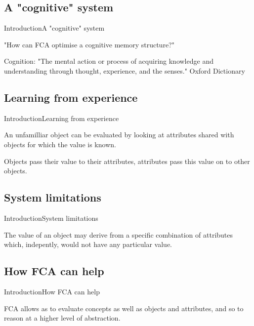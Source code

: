 \subsection{A "cognitive" system}
\begin{frame}{Introduction}{A "cognitive" system}

"How can FCA  optimise a cognitive memory  structure?"

Cognition:
"The mental action or process of acquiring knowledge and understanding through 
thought, experience, and the senses."
Oxford Dictionary

\end{frame}

\subsection{Learning from experience}
\begin{frame}{Introduction}{Learning from experience}

An unfamilliar object can be evaluated by looking at attributes shared with 
objects for which the value is known.

Objects pass their value to their attributes, attributes pass this value on to 
other objects.

\end{frame}

\subsection{System limitations}
\begin{frame}{Introduction}{System limitations}

The value of an object may derive from a specific combination of attributes 
which, indepently, would not have any particular value.

\end{frame}

\subsection{How FCA can help}
\begin{frame}{Introduction}{How FCA can help}

FCA allows as to evaluate concepts as well as objects and attributes, and so to 
reason at a higher level of abstraction.

\end{frame}